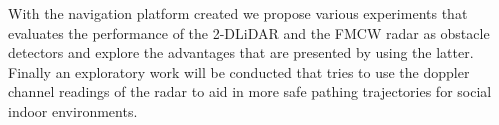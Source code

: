         \TEXT{}     
       {With the navigation platform created we propose various experiments that evaluates the performance of the   2-D\ac{LiDAR} and the \ac{FMCW} radar as obstacle detectors and explore the advantages that are presented by using the latter. Finally an exploratory work will be conducted that tries to use the doppler channel readings of the \ac{radar} to aid in more safe pathing trajectories for social indoor environments.
       
        }
\EndTitlePage
\titlepage\ \endtitlepage %